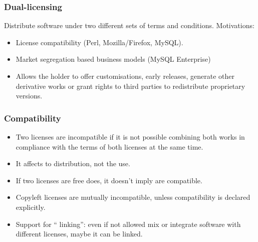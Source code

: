 \begin{frame}
\frametitle{Dual-licensing}

Distribute software under two different sets of terms and conditions. Motivations:

\begin{itemize}
\item License compatibility (Perl, Mozilla/Firefox, MySQL).
\item Market segregation based business models (MySQL Enterprise)
\item Allows the holder to offer customisations, early releases, generate other derivative works or grant rights to third parties to redistribute proprietary versions.
\end{itemize}

                                                 
\end{frame}



\begin{frame}
\frametitle{Compatibility}

\begin{itemize}
\item Two licenses are incompatible if it is not possible combining both works in compliance with the terms of  both licenses at the same time. 
\item It affects to distribution, not the use. 
\item If two licenses are free does, it doesn't imply are compatible. 
\item Copyleft licenses are mutually incompatible, unless compatibility is declared explicitly. 
\item Support for `` linking'': even if not allowed mix or integrate software with different licenses, maybe it can be linked. 
\end{itemize}

\end{frame}



